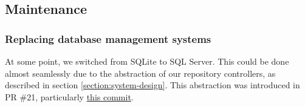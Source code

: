\subsection{Maintenance}

\subsubsection{Replacing database management systems}

At some point, we switched from SQLite to SQL Server. This could be done almost seamlessly due to the abstraction of our repository controllers, as described in section \ref{section:system-design}.
This abstraction was introduced in PR \#21, particularly \href{https://github.com/Devops-2022-Group-R/itu-minitwit/pull/21/commits/96d0ea601453ff9d3efe52c30b2435c6308f120b}{\color{blue}this commit}.
